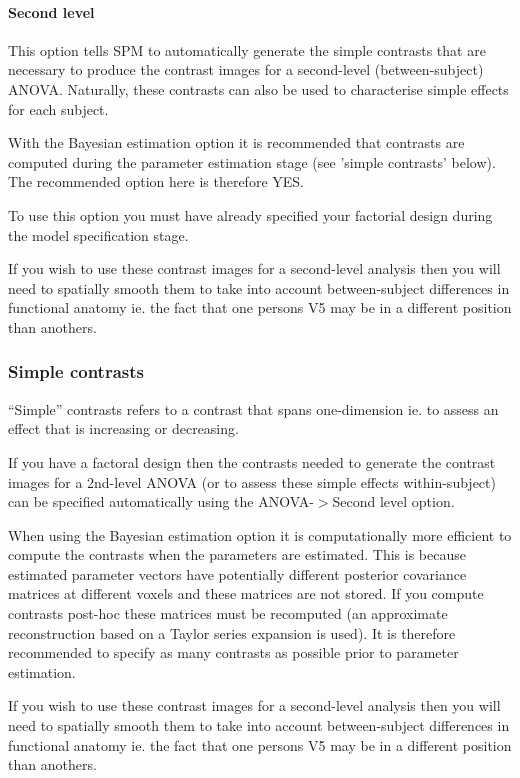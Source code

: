 \paragraph{Second level}

This option tells SPM to automatically generate the simple contrasts that are necessary to produce the contrast images for a second-level (between-subject) ANOVA. Naturally, these contrasts can also be used to characterise simple effects for each subject.

With the Bayesian estimation option it is recommended that contrasts are computed during the parameter estimation stage (see 'simple contrasts' below). The recommended option here is therefore YES.

To use this option you must have already specified your factorial design during the model specification stage. 

If you wish to use these contrast images for a second-level analysis then you will need to spatially smooth them to take into account between-subject differences in functional anatomy ie. the fact that one persons V5 may be in a different position than anothers.

\subsubsection{Simple contrasts}

``Simple'' contrasts refers to a contrast that spans one-dimension ie. to assess an effect that is increasing or decreasing.

If you have a factoral design then the contrasts needed to generate the contrast images for a 2nd-level ANOVA (or to assess these simple effects within-subject) can be specified automatically using the ANOVA-$>$Second level option.

When using the Bayesian estimation option it is computationally more efficient to compute the contrasts when the parameters are estimated. This is because estimated parameter vectors have potentially different posterior covariance matrices at different voxels and these matrices are not stored. If you compute contrasts post-hoc these matrices must be recomputed (an approximate reconstruction based on a Taylor series expansion is used). It is therefore recommended to specify as many contrasts as possible prior to parameter estimation.

If you wish to use these contrast images for a second-level analysis then you will need to spatially smooth them to take into account between-subject differences in functional anatomy ie. the fact that one persons V5 may be in a different position than anothers. 

